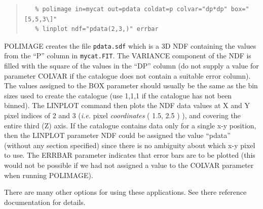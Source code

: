 \documentclass[twoside,11pt]{article}
\renewcommand{\_}{\texttt{\symbol{95}}}
\newenvironment{myquote}{\begin{quote}\begin{small}}{\end{small}\end{quote}}
\begin{document}
\begin{myquote}
\begin{verbatim}
   % polimage in=mycat out=pdata coldat=p colvar="dp*dp" box="[5,5,3\]"
   % linplot ndf="pdata(2,3,)" errbar
\end{verbatim}
\end{myquote}

POLIMAGE creates the file {\tt pdata.sdf} which is a 3D NDF containing
the values from the ``P'' column in {\tt mycat.FIT}. The VARIANCE
component of the NDF is filled with the square of the values in the
``DP'' column (do not supply a value for parameter COLVAR if the
catalogue does not contain a suitable error column). The values assigned
to the BOX parameter should usually be the same as the bin sizes used to
create the catalogue (use 1,1,1 if the catalogue has not been binned).
The LINPLOT command then plots the NDF data values at X and Y pixel
indices of 2 and 3 (\emph{i.e.} pixel \emph{coordinates} ( 1.5, 2.5 ) ),
and covering the entire third (Z) axis. If the catalogue contains data
only for a single x-y position, then the LINPLOT parameter NDF could be
assigned the value ``pdata'' (without any section specified) since there
is no ambiguity about which x-y pixel to use. The ERRBAR parameter
indicates that error bars are to be plotted (this would not be possible
if we had not assigned a value to the COLVAR parameter when running
POLIMAGE).

There are many other options for using these applications. See there
reference documentation for details.
\end{document}
